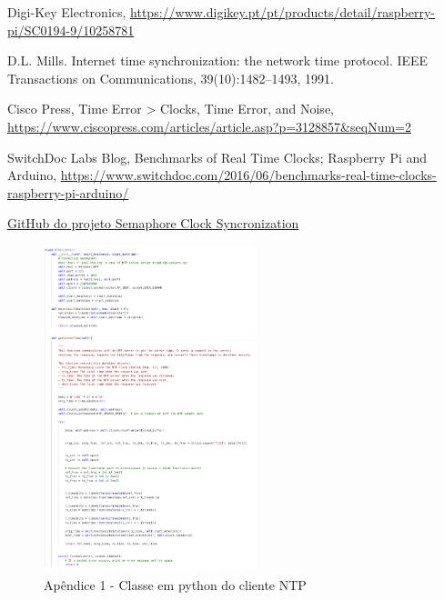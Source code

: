 \documentclass[conference]{IEEEtran}
\begin{document}
\begin{thebibliography}{00}
 Digi-Key Electronics, \url{https://www.digikey.pt/pt/products/detail/raspberry-pi/SC0194-9/10258781}

 D.L. Mills. Internet time synchronization: the network time protocol. IEEE Transactions on Communications, 39(10):1482–1493, 1991.

 Cisco Press, Time Error > Clocks, Time Error, and Noise, \url{https://www.ciscopress.com/articles/article.asp?p=3128857\&seqNum=2}

 SwitchDoc Labs Blog, Benchmarks of Real Time Clocks; Raspberry Pi and Arduino, \url{https://www.switchdoc.com/2016/06/benchmarks-real-time-clocks-raspberry-pi-arduino/}

\href{https://github.com/AndBarata/DistributedSystems/tree/main/Projeto}{GitHub do projeto Semaphore Clock Syncronization}
\end{thebibliography}


\onecolumn %

\renewcommand{\appendixname}{Apêndice} %
\appendix


\begin{figure}[h]
    \centering
    \includegraphics[width=0.55\textwidth]{figures/clientNTP.png}
    \caption*{Apêndice 1 - Classe em python do cliente NTP}
\end{figure}
\end{document}
